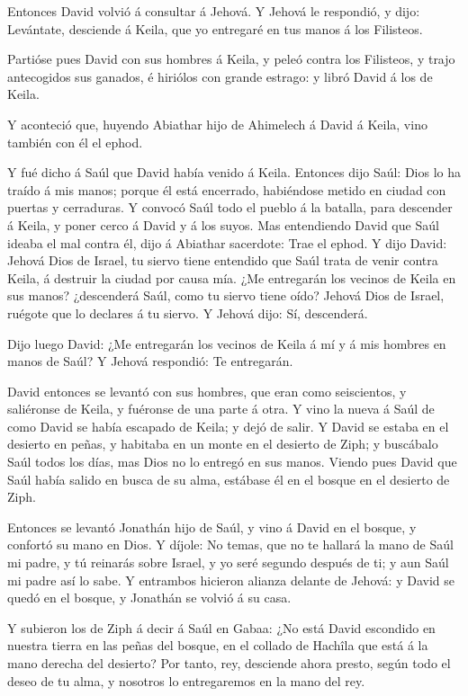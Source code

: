  Entonces David volvió á consultar á Jehová. Y Jehová le
respondió, y dijo: Levántate, desciende á Keila, que yo entregaré en tus
manos á los Filisteos.

 Partióse pues David con sus hombres á Keila, y peleó contra
los Filisteos, y trajo antecogidos sus ganados, é hiriólos con grande
estrago: y libró David á los de Keila.

 Y aconteció que, huyendo Abiathar hijo de Ahimelech á David
á Keila, vino también con él el ephod.

 Y fué dicho á Saúl que David había venido á Keila. Entonces
dijo Saúl: Dios lo ha traído á mis manos; porque él está encerrado,
habiéndose metido en ciudad con puertas y cerraduras.  Y
convocó Saúl todo el pueblo á la batalla, para descender á Keila, y
poner cerco á David y á los suyos.  Mas entendiendo David
que Saúl ideaba el mal contra él, dijo á Abiathar sacerdote: Trae el
ephod.  Y dijo David: Jehová Dios de Israel, tu siervo
tiene entendido que Saúl trata de venir contra Keila, á destruir la
ciudad por causa mía.  ¿Me entregarán los vecinos de Keila
en sus manos? ¿descenderá Saúl, como tu siervo tiene oído? Jehová Dios
de Israel, ruégote que lo declares á tu siervo. Y Jehová dijo: Sí,
descenderá.

 Dijo luego David: ¿Me entregarán los vecinos de Keila á mí
y á mis hombres en manos de Saúl? Y Jehová respondió: Te entregarán.

 David entonces se levantó con sus hombres, que eran como
seiscientos, y saliéronse de Keila, y fuéronse de una parte á otra. Y
vino la nueva á Saúl de como David se había escapado de Keila; y dejó de
salir.  Y David se estaba en el desierto en peñas, y
habitaba en un monte en el desierto de Ziph; y buscábalo Saúl todos los
días, mas Dios no lo entregó en sus manos.  Viendo pues
David que Saúl había salido en busca de su alma, estábase él en el
bosque en el desierto de Ziph.

 Entonces se levantó Jonathán hijo de Saúl, y vino á David
en el bosque, y confortó su mano en Dios.  Y díjole: No
temas, que no te hallará la mano de Saúl mi padre, y tú reinarás sobre
Israel, y yo seré segundo después de ti; y aun Saúl mi padre así lo
sabe.  Y entrambos hicieron alianza delante de Jehová: y
David se quedó en el bosque, y Jonathán se volvió á su casa.

 Y subieron los de Ziph á decir á Saúl en Gabaa: ¿No está
David escondido en nuestra tierra en las peñas del bosque, en el collado
de Hachîla que está á la mano derecha del desierto?  Por
tanto, rey, desciende ahora presto, según todo el deseo de tu alma, y
nosotros lo entregaremos en la mano del rey.


